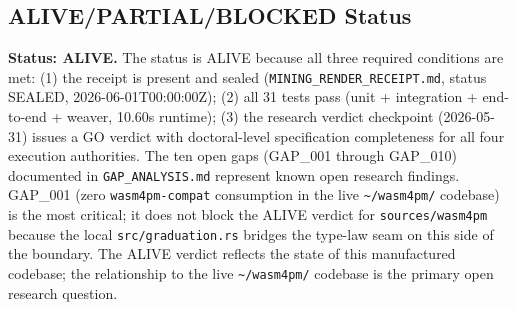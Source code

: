 \subsection{ALIVE/PARTIAL/BLOCKED Status}
\label{sec:sources-wasm4pm-evidence-status}

\textbf{Status: ALIVE.} The status is ALIVE because all three required conditions are met: (1)
the receipt is present and sealed (\texttt{MINING\_RENDER\_RECEIPT.md}, status SEALED,
2026-06-01T00:00:00Z); (2) all 31 tests pass (unit + integration + end-to-end + weaver,
10.60s runtime); (3) the research verdict checkpoint (2026-05-31) issues a GO verdict with
doctoral-level specification completeness for all four execution authorities. The ten open gaps
(GAP\_001 through GAP\_010) documented in \texttt{GAP\_ANALYSIS.md} represent known open
research findings. GAP\_001 (zero \texttt{wasm4pm-compat} consumption in the live
\texttt{\textasciitilde/wasm4pm/} codebase) is the most critical; it does not block the ALIVE
verdict for \texttt{sources/wasm4pm} because the local \texttt{src/graduation.rs} bridges the
type-law seam on this side of the boundary. The ALIVE verdict reflects the state of this
manufactured codebase; the relationship to the live \texttt{\textasciitilde/wasm4pm/} codebase
is the primary open research question.
